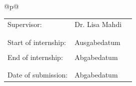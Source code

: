 \begin{center}
\begin{tabular}{@{}p{\textwidth}@{}}
\begin{center}
\begin{tabular}{lll}
\large{Supervisor:} & \large Dr. Lisa Mahdi\\
\\

\\
\large{Start of internship:}  & \large Ausgabedatum\\
\\
\large{End of internship:}  & \large Abgabedatum\\
\\
\\
\large{Date of submission:}  & \large Abgabedatum\\

\end{tabular}
\end{center}

\end{tabular}
\end{center}